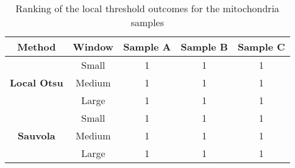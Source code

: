 \begin{table}[h!]
    \centering
    \begin{tabular}{ccccc}
    \hline
    \textbf{Method} & \textbf{Window} & \textbf{Sample A} & \textbf{Sample B} & \textbf{Sample C} \\ \hline
    \multirow{3}{*}{\textbf{Local Otsu}} & Small & 1 & 1 & 1 \\
    & Medium & 1 & 1 & 1 \\ & Large & 1 & 1 & 1 \\ \hline
    \multirow{3}{*}{\textbf{Sauvola}} & Small & 1 & 1 & 1 \\
    & Medium & 1 & 1 & 1 \\ & Large & 1 & 1 & 1 \\ \hline
    \end{tabular}
    \caption{Ranking of the local threshold outcomes for the mitochondria samples}
    \label{tab:local_mito_rankings}
\end{table}

